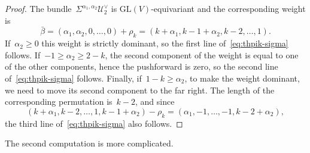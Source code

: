 \documentclass[a4paper]{article}
\newcommand{\GL}{\mathrm{GL}}
\newcommand{\cU}{\mathcal{U}}
\theoremstyle{remark}
\theoremstyle{definition}
\begin{document}
\begin{proof}
The bundle~\(\Sigma^{\alpha_1,\alpha_2}\cU_2^\vee\) is \(\GL(V)\)-equivariant and the corresponding weight is
\begin{equation*}
\bar\beta = (\alpha_1,\alpha_2,0,\dots,0) + \rho_k = (k+\alpha_1,k-1+\alpha_2,k-2,\dots,1).
\end{equation*}
If~\(\alpha_2 \ge 0\) this weight is strictly dominant, so the first line of~\eqref{eq:thpik-sigma} follows.
If~\(-1 \ge \alpha_2 \ge 2 - k\), the second component of the weight is equal to one of the other components, 
hence the pushforward is zero, so the second line of~\eqref{eq:thpik-sigma} follows.
Finally, if~\(1 - k \ge \alpha_2\), to make the weight dominant, we need to move its second component to the far right.
The length of the corresponding permutation is~\(k - 2\), and since
\begin{equation*}
(k+\alpha_1,k-2,\dots,1,k-1+\alpha_2) - \rho_k = (\alpha_1,-1,\dots,-1,k-2+\alpha_2),
\end{equation*}
the third line of~\eqref{eq:thpik-sigma} also follows.
\end{proof}

The second computation is more complicated.
\end{document}
